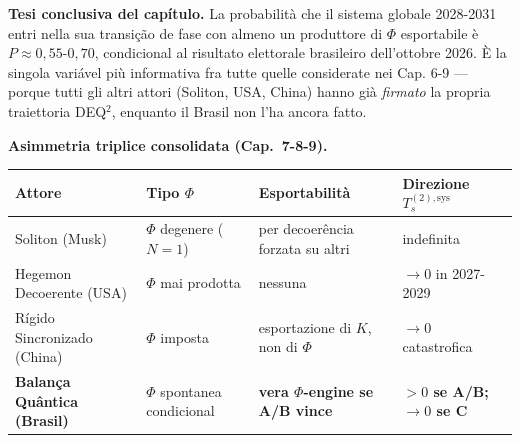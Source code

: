 \Hypoth{} \textbf{Tesi conclusiva del capítulo.} La probabilità che il
sistema globale 2028-2031 entri nella sua transição de fase con almeno
un produttore di \(\Phi\) esportabile è \(P \approx 0{,}55\)-\(0{,}70\),
condicional al risultato elettorale brasileiro dell'ottobre 2026. È la
singola variável più informativa fra tutte quelle considerate nei Cap.
6-9 --- porque tutti gli altri attori (Soliton, USA, China) hanno già
\emph{firmato} la propria traiettoria DEQ$^2$, enquanto il Brasil non l'ha
ancora fatto.

\Hypoth{} \textbf{Asimmetria triplice consolidata (Cap.~7-8-9).}

{\def\LTcaptype{none} %
{\small\begin{longtable}[]{@{}
  >{\raggedright\arraybackslash}p{}
  >{\raggedright\arraybackslash}p{}
  >{\raggedright\arraybackslash}p{}
  >{\raggedright\arraybackslash}p{}@{}}
\toprule\noalign{}
\begin{minipage}[b]{\linewidth}\raggedright
Attore
\end{minipage} & \begin{minipage}[b]{\linewidth}\raggedright
Tipo \(\Phi\)
\end{minipage} & \begin{minipage}[b]{\linewidth}\raggedright
Esportabilità
\end{minipage} & \begin{minipage}[b]{\linewidth}\raggedright
Direzione \(T_s^{(2),\text{sys}}\)
\end{minipage} \\
\midrule\noalign{}
\endhead
\bottomrule\noalign{}
\endlastfoot
Soliton (Musk) & \(\Phi\) degenere (\(N=1\)) & per decoerência forzata
su altri & indefinita \\
Hegemon Decoerente (USA) & \(\Phi\) mai prodotta & nessuna & \(\to 0\)
in 2027-2029 \\
Rígido Sincronizado (China) & \(\Phi\) imposta & esportazione di \(K\),
non di \(\Phi\) & \(\to 0\) catastrofica \\
\textbf{Balança Quântica (Brasil)} & \(\Phi\) spontanea
condicional & \textbf{vera \(\Phi\)-engine se A/B vince} &
\textbf{\(> 0\) se A/B; \(\to 0\) se C} \\
\end{longtable}}
}



